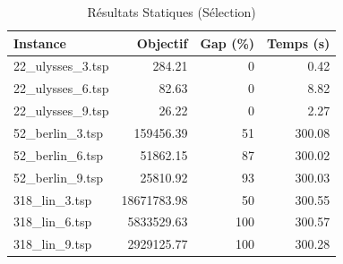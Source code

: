 \begin{table}[H]
\centering
\caption{Résultats Statiques (Sélection)}
\small
\begin{tabular}{|l|r|r|r|}
\hline
\textbf{Instance} & \textbf{Objectif} & \textbf{Gap (\%)} & \textbf{Temps (s)} \\
\hline
22\_ulysses\_3.tsp & 284.21 & 0 & 0.42 \\
22\_ulysses\_6.tsp & 82.63 & 0 & 8.82 \\
22\_ulysses\_9.tsp & 26.22 & 0 & 2.27 \\
52\_berlin\_3.tsp & 159456.39 & 51 & 300.08 \\
52\_berlin\_6.tsp & 51862.15 & 87 & 300.02 \\
52\_berlin\_9.tsp & 25810.92 & 93 & 300.03 \\
318\_lin\_3.tsp & 18671783.98 & 50 & 300.55 \\
318\_lin\_6.tsp & 5833529.63 & 100 & 300.57 \\
318\_lin\_9.tsp & 2929125.77 & 100 & 300.28 \\
\hline
\end{tabular}
\end{table}
